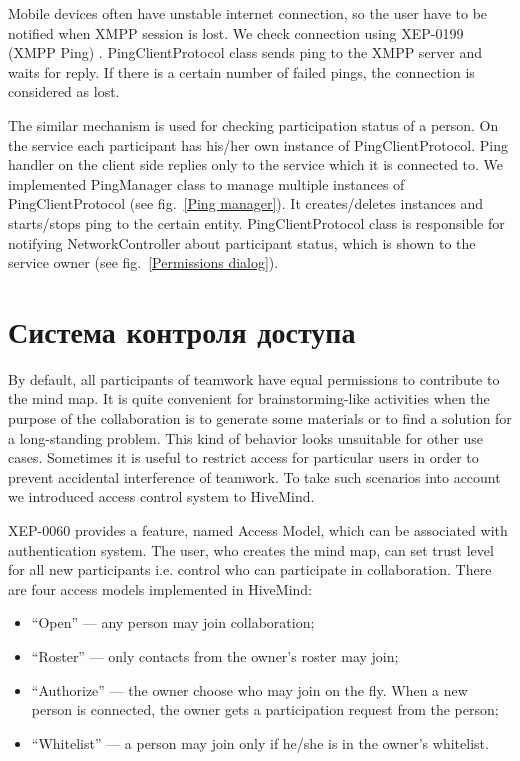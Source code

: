 Mobile devices often have unstable internet connection, so the user have to be
notified when XMPP session is lost. We check connection using XEP-0199 (XMPP
Ping) \cite{ping-xep-0199}. PingClientProtocol class sends ping to the XMPP
server and waits for reply. If there is a certain number of failed pings, the
connection is considered as lost.

The similar mechanism is used for checking participation status of a person. On
the service each participant has his/her own instance of PingClientProtocol. Ping
handler on the client side replies only to the service which it is connected
to. We implemented PingManager class to manage multiple instances of
PingClientProtocol (see fig.~\ref{Ping manager}).  It creates/deletes instances
and starts/stops ping to the certain entity. PingClientProtocol class is
responsible for notifying NetworkController about participant status, which is
shown to the service owner (see fig.~\ref{Permissions dialog}).


\section{Система контроля доступа}

By default, all participants of teamwork have equal permissions to contribute to
the mind map. It is quite convenient for brainstorming-like activities when the
purpose of the collaboration is to generate some materials or to find a solution
for a long-standing problem. This kind of behavior looks unsuitable for other
use cases. Sometimes it is useful to restrict access for particular users in
order to prevent accidental interference of teamwork. To take such scenarios
into account we introduced access control system to HiveMind.

XEP-0060 provides a feature, named Access Model, which can be associated with
authentication system. The user, who creates the mind map, can set trust level
for all new participants i.e. control who can participate in collaboration.
There are four access models implemented in HiveMind:
\begin{itemize}
\item ``Open'' --- any person may join collaboration;
\item ``Roster'' --- only contacts from the owner’s roster may join;
\item ``Authorize'' --- the owner choose who may join on the fly. When a new
  person is connected, the owner gets a participation request from the person;
\item ``Whitelist'' --- a person may join only if he/she is in the owner’s
  whitelist.
\end{itemize}

